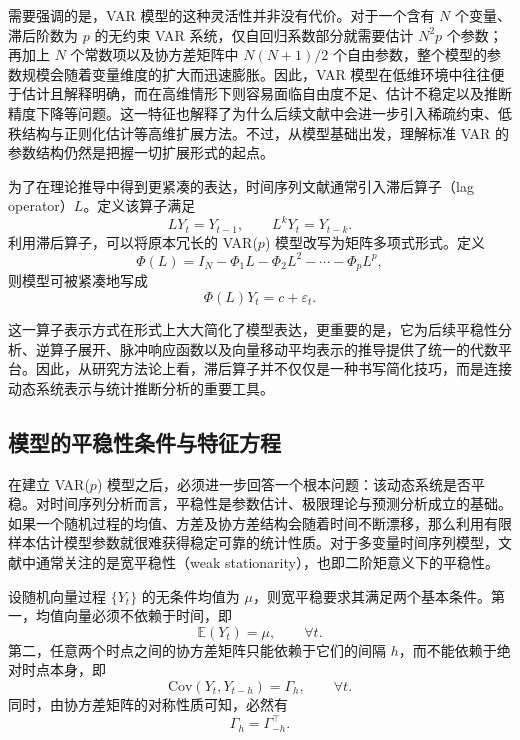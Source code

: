 \documentclass[UTF8,a4paper,12pt]{ctexbook}
\begin{document}
需要强调的是，VAR 模型的这种灵活性并非没有代价。对于一个含有 $N$ 个变量、滞后阶数为 $p$ 的无约束 VAR 系统，仅自回归系数部分就需要估计 $N^2p$ 个参数；再加上 $N$ 个常数项以及协方差矩阵中 $N(N+1)/2$ 个自由参数，整个模型的参数规模会随着变量维度的扩大而迅速膨胀。因此，VAR 模型在低维环境中往往便于估计且解释明确，而在高维情形下则容易面临自由度不足、估计不稳定以及推断精度下降等问题。这一特征也解释了为什么后续文献中会进一步引入稀疏约束、低秩结构与正则化估计等高维扩展方法。不过，从模型基础出发，理解标准 VAR 的参数结构仍然是把握一切扩展形式的起点。

为了在理论推导中得到更紧凑的表达，时间序列文献通常引入滞后算子（lag operator）$L$。定义该算子满足
\begin{equation}
LY_t=Y_{t-1}, \qquad L^kY_t=Y_{t-k}.
\end{equation}
利用滞后算子，可以将原本冗长的 VAR($p$) 模型改写为矩阵多项式形式。定义
\begin{equation}
\Phi(L)=I_N-\Phi_1L-\Phi_2L^2-\cdots-\Phi_pL^p,
\end{equation}
则模型可被紧凑地写成
\begin{equation}
\Phi(L)Y_t = c + \varepsilon_t.
\end{equation}

这一算子表示方式在形式上大大简化了模型表达，更重要的是，它为后续平稳性分析、逆算子展开、脉冲响应函数以及向量移动平均表示的推导提供了统一的代数平台。因此，从研究方法论上看，滞后算子并不仅仅是一种书写简化技巧，而是连接动态系统表示与统计推断分析的重要工具。

\subsection{模型的平稳性条件与特征方程}

在建立 VAR($p$) 模型之后，必须进一步回答一个根本问题：该动态系统是否平稳。对时间序列分析而言，平稳性是参数估计、极限理论与预测分析成立的基础。如果一个随机过程的均值、方差及协方差结构会随着时间不断漂移，那么利用有限样本估计模型参数就很难获得稳定可靠的统计性质。对于多变量时间序列模型，文献中通常关注的是宽平稳性（weak stationarity），也即二阶矩意义下的平稳性。

设随机向量过程 $\{Y_t\}$ 的无条件均值为 $\mu$，则宽平稳要求其满足两个基本条件。第一，均值向量必须不依赖于时间，即
\begin{equation}
\mathbb{E}(Y_t)=\mu, \qquad \forall t.
\end{equation}
第二，任意两个时点之间的协方差矩阵只能依赖于它们的间隔 $h$，而不能依赖于绝对时点本身，即
\begin{equation}
\mathrm{Cov}(Y_t,Y_{t-h})=\Gamma_h, \qquad \forall t.
\end{equation}
同时，由协方差矩阵的对称性质可知，必然有
\begin{equation}
\Gamma_h=\Gamma_{-h}^\top.
\end{equation}
\end{document}

